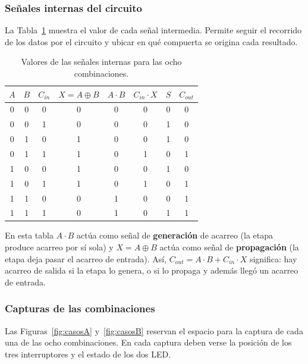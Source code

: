 \documentclass[10pt]{article}
\begin{document}
\subsubsection{Señales internas del circuito}

La Tabla~\ref{tab:internas} muestra el valor de cada señal intermedia. Permite
seguir el recorrido de los datos por el circuito y ubicar en qué compuerta se
origina cada resultado.

\begin{table}[!htbp]
  \centering
  \caption{Valores de las señales internas para las ocho combinaciones.}
  \label{tab:internas}
  \begin{tabular}{ccc|ccc|cc}
    \toprule
    $A$ & $B$ & $C_{in}$ & $X=A\oplus B$ & $A\cdot B$ & $C_{in}\cdot X$ & $S$ & $C_{out}$ \\
    \midrule
    0 & 0 & 0 & 0 & 0 & 0 & 0 & 0 \\
    0 & 0 & 1 & 0 & 0 & 0 & 1 & 0 \\
    0 & 1 & 0 & 1 & 0 & 0 & 1 & 0 \\
    0 & 1 & 1 & 1 & 0 & 1 & 0 & 1 \\
    1 & 0 & 0 & 1 & 0 & 0 & 1 & 0 \\
    1 & 0 & 1 & 1 & 0 & 1 & 0 & 1 \\
    1 & 1 & 0 & 0 & 1 & 0 & 0 & 1 \\
    1 & 1 & 1 & 0 & 1 & 0 & 1 & 1 \\
    \bottomrule
  \end{tabular}
\end{table}

En esta tabla $A\cdot B$ actúa como señal de \textbf{generación} de acarreo
(la etapa produce acarreo por sí sola) y $X = A\oplus B$ actúa como señal de
\textbf{propagación} (la etapa deja pasar el acarreo de entrada). Así,
$C_{out} = A\cdot B + C_{in}\cdot X$ significa: hay acarreo de salida si la
etapa lo genera, o si lo propaga y además llegó un acarreo de entrada.

\subsubsection{Capturas de las combinaciones}

Las Figuras~\ref{fig:casosA} y~\ref{fig:casosB} reservan el espacio para la
captura de cada una de las ocho combinaciones. En cada captura deben verse la
posición de los tres interruptores y el estado de los dos LED.
\end{document}
